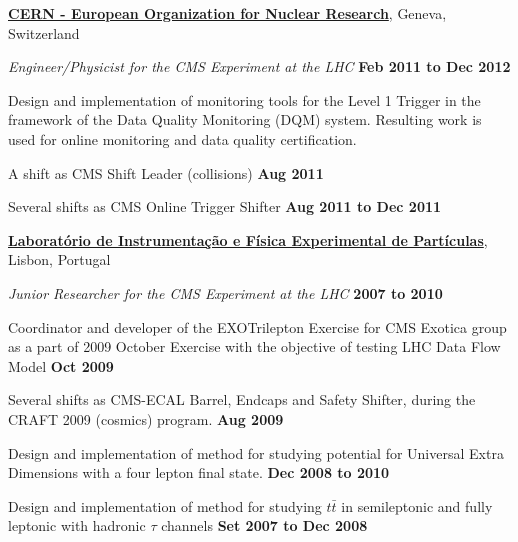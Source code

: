 \documentclass[10pt]{article}
\newenvironment{outerlist}[1][\enskip\textbullet]%
        {\begin{itemize}[#1]}{\end{itemize}%
         \vspace{-.6\baselineskip}}
\newenvironment{innerlist}[1][\enskip\textbullet]%
        {\begin{compactitem}[#1]}{\end{compactitem}}
\newcommand{\blankline}{\quad\pagebreak[2]}
\begin{document}
\href{http://www.cern.ch/}{\textbf{CERN - European Organization for Nuclear Research}},
Geneva, Switzerland
\begin{outerlist}

\item[] \textit{Engineer/Physicist for the CMS Experiment at the LHC}%
        \hfill \textbf{Feb 2011 to Dec 2012}
\begin{innerlist}
\item Design and implementation of monitoring tools for the Level 1 Trigger in the framework of
      the Data Quality Monitoring (DQM) system. Resulting work is used for online monitoring and
      data quality certification. 
\item A shift as CMS Shift Leader (collisions) \hfill \textbf{Aug 2011}
\item Several shifts as CMS Online Trigger Shifter \hfill \textbf{Aug 2011 to Dec 2011}
\end{innerlist}

\end{outerlist}
\blankline

%
\href{http://www.lip.pt/}{\textbf{Laboratório de Instrumentação e Física Experimental de Partículas}},
Lisbon, Portugal
\begin{outerlist}

\item[] \textit{Junior Researcher for the CMS Experiment at the LHC}%
        \hfill \textbf{2007 to 2010}
\begin{innerlist}
\item Coordinator and developer of the EXOTrilepton Exercise for CMS Exotica group as a part of 2009 October Exercise with the objective of testing LHC Data Flow Model
\hfill \textbf{Oct 2009}
\item Several shifts as CMS-ECAL Barrel, Endcaps and Safety Shifter, during the CRAFT 2009 (cosmics) program. 
\hfill \textbf{Aug 2009}
\item Design and implementation of method for studying potential for Universal Extra Dimensions with a four lepton final state.
\hfill \textbf{Dec 2008 to 2010}
\item Design and implementation of method for studying $t\bar{t}$ in semileptonic and fully leptonic with hadronic $\tau$ channels
\hfill \textbf{Set 2007 to Dec 2008}
\end{innerlist}

\end{outerlist}

\blankline
\end{document}
